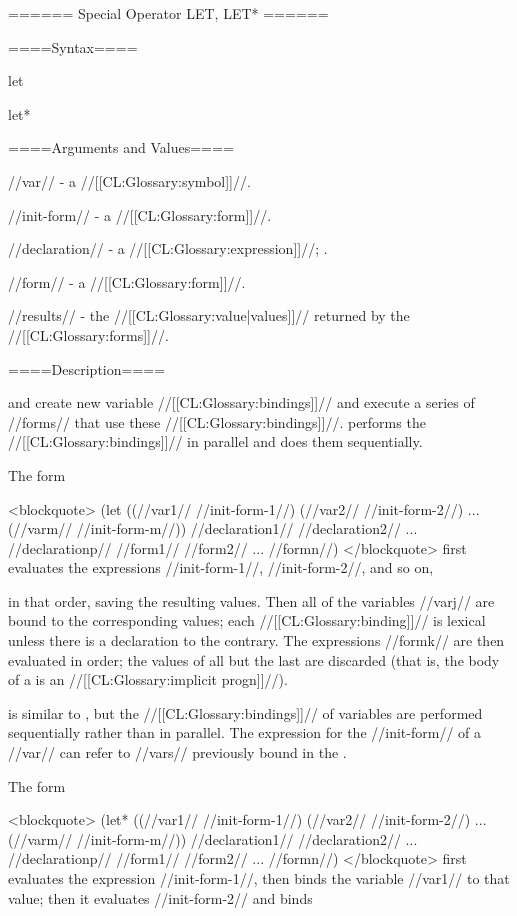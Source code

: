 ====== Special Operator LET, LET* ======

====Syntax====

\DefspecWithValues let {\paren{\star{\VarValue}}  } {}

\DefspecWithValues let* {\paren{\star{\VarValue}}  } {}

====Arguments and Values====

//var// - a //[[CL:Glossary:symbol]]//.

//init-form// - a //[[CL:Glossary:form]]//.

//declaration// - a  //[[CL:Glossary:expression]]//; \noeval.

//form// - a //[[CL:Glossary:form]]//.

//results// - the //[[CL:Glossary:value|values]]// returned by the //[[CL:Glossary:forms]]//.

====Description====

 and  create new variable //[[CL:Glossary:bindings]]// and execute a series of //forms// that use these //[[CL:Glossary:bindings]]//.  performs the //[[CL:Glossary:bindings]]// in parallel and  does them sequentially.


The form

<blockquote> (let ((//var1// //init-form-1//) (//var2// //init-form-2//) ... (//varm// //init-form-m//)) //declaration1// //declaration2// ... //declarationp// //form1// //form2// ... //formn//) </blockquote> first evaluates the expressions //init-form-1//, //init-form-2//, and so on,

in that order, saving the resulting values. Then all of the variables //varj// are bound to the corresponding values; each //[[CL:Glossary:binding]]// is lexical unless there is a  declaration to the contrary. The expressions //formk// are then evaluated in order; the values of all but the last are discarded (that is, the body of a  is an //[[CL:Glossary:implicit progn]]//).

 is similar to , but the //[[CL:Glossary:bindings]]// of variables are performed sequentially rather than in parallel. The expression for the //init-form// of a //var// can refer to //vars// previously bound in the .


The form

<blockquote> (let* ((//var1// //init-form-1//) (//var2// //init-form-2//) ... (//varm// //init-form-m//)) //declaration1// //declaration2// ... //declarationp// //form1// //form2// ... //formn//) </blockquote> first evaluates the expression //init-form-1//, then binds the variable //var1// to that value; then it evaluates //init-form-2// and binds

